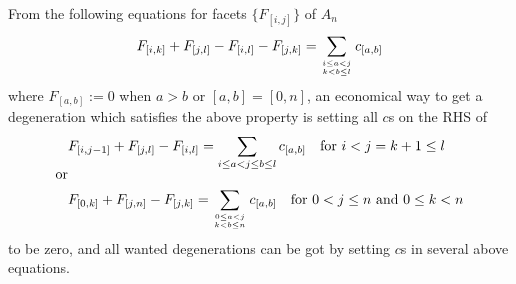 \documentclass[hidelinks,12pt]{article}
\begin{document}

From the following equations for facets $\{F_{[i,j]}\}$ of $A_n$
\[
	F_{[i,k]}+F_{[j,l]}-F_{[i,l]}-F_{[j,k]}=
	\sum_{i\leq a<j\atop{k<b\leq l}} c_{[a,b]} 
\]
where $F_{[a,b]}:=0$ when $a>b$ or $[a,b]=[0,n]$,
an economical way to get a degeneration which satisfies the above property is setting all $c$s on the RHS of 
\begin{align*}
&F_{[i,j-1]}+F_{[j,l]}-F_{[i,l]}= \sum_{i\leq a<j\leq b\leq l} c_{[a,b]} 
\quad \text{for $i<j=k+1\leq l$ }\\[-1.5ex]
\text{or}&\\
&F_{[0,k]}+F_{[j,n]}-F_{[j,k]}= \sum_{0\leq a<j\atop{k<b\leq n}} c_{[a,b]} 
\quad \text{for $0<j\leq n$ and $0\leq k<n$}
\end{align*}
to be zero, and all wanted degenerations can be got by setting $c$s in several above equations. 
\end{document}
